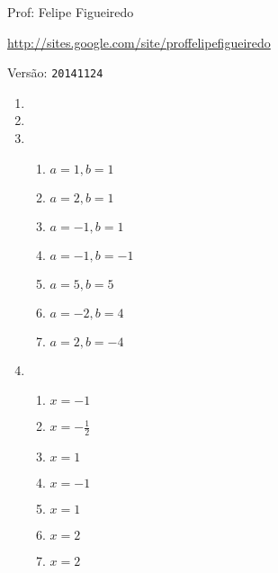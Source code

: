 \documentclass[a4paper]{article}
\begin{document}
\parbox[c]{.825\textwidth}{\raggedright%
{Prof: Felipe Figueiredo\par}
{\url{http://sites.google.com/site/proffelipefigueiredo}}
}

Versão: \verb|20141124|



\begin{enumerate}

\section{}

\section{}

\item %

\item %

\item %
  \begin{enumerate}
  \item $a=1, b=1$
  \item $a=2, b=1$
  \item $a=-1, b=1$
  \item $a=-1, b=-1$
  \item $a=5, b=5$
  \item $a=-2, b=4$
  \item $a=2, b=-4$
  \end{enumerate}
\item %

  \begin{enumerate}
  \item $x= -1$ %
  \item $x= -\frac{1}{2}$ %
  \item $x= 1$ %
  \item $x= -1$ %
  \item $x= 1$ %
  \item $x= 2$ %
  \item $x= 2$ %
  \end{enumerate}


\end{enumerate}
\end{document}
